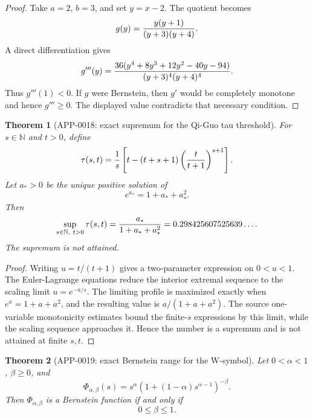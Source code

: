 \documentclass[11pt]{article}
\numberwithin{equation}{section}
\newtheorem{theorem}{Theorem}[section]
\theoremstyle{definition}
\theoremstyle{remark}
\newcommand{\1}{\mathbf 1}
\begin{document}
\begin{proof}
Take \(a=2\), \(b=3\), and set \(y=x-2\).  The quotient becomes
\[
  g(y)={y(y+1)\over (y+3)(y+4)} .
\]
A direct differentiation gives
\[
  g'''(y)=
 {36(y^4+8y^3+12y^2-40y-94)\over (y+3)^4(y+4)^4}.
\]
Thus \(g'''(1)<0\).  If \(g\) were Bernstein, then \(g'\) would be completely
monotone and hence \(g'''\ge0\).  The displayed value contradicts that
necessary condition.
\end{proof}

\begin{theorem}[APP-0018: exact supremum for the Qi-Guo tau threshold]
\label{thm:app18-qg-tau}
For \(s\in\mathbb N\) and \(t>0\), define
\[
  \tau(s,t)={1\over s}\left[t-(t+s+1)
        \left({t\over t+1}\right)^{s+1}\right].
\]
Let \(a_*>0\) be the unique positive solution of
\[
  e^{a_*}=1+a_*+a_*^2 .
\]
Then
\[
  \sup_{s\in\mathbb N,\ t>0}\tau(s,t)
   ={a_*\over 1+a_*+a_*^2}
   =0.298425607525639\ldots .
\]
The supremum is not attained.
\end{theorem}

\begin{proof}
Writing \(u=t/(t+1)\) gives a two-parameter expression on \(0<u<1\).  The
Euler-Lagrange equations reduce the interior extremal sequence to the scaling
limit \(u=e^{-a/s}\).  The limiting profile is maximized exactly when
\(e^a=1+a+a^2\), and the resulting value is \(a/(1+a+a^2)\).  The source
one-variable monotonicity estimates bound the finite-\(s\) expressions by this
limit, while the scaling sequence approaches it.  Hence the number is a
supremum and is not attained at finite \(s,t\).
\end{proof}

\begin{theorem}[APP-0019: exact Bernstein range for the W-symbol]
\label{thm:app19-w-symbol}
Let \(0<\alpha<1\), \(\beta\ge0\), and
\[
  \Phi_{\alpha,\beta}(s)
     =s^\alpha\left(1+(1-\alpha)s^{\alpha-1}\right)^{-\beta}.
\]
Then \(\Phi_{\alpha,\beta}\) is a Bernstein function if and only if
\[
  0\le \beta\le 1 .
\]
\end{theorem}
\end{document}
